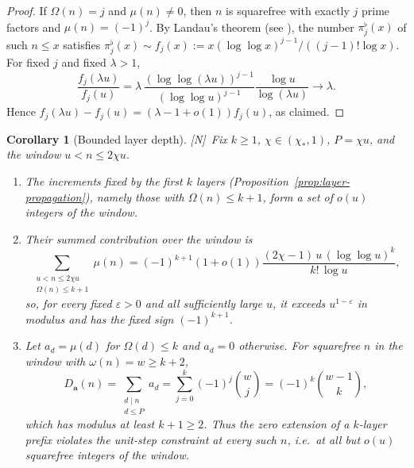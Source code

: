 \documentclass[11pt,reqno]{amsart}
\numberwithin{equation}{section}
\theoremstyle{plain}
\newtheorem{corollary}[theorem]{Corollary}
\theoremstyle{definition}
\theoremstyle{remark}
\newcommand{\eps}{\varepsilon}
\newcommand{\tagN}{\textup{[N]}}
\begin{document}
\begin{proof}
If $\Omega(n)=j$ and $\mu(n)\ne0$, then $n$ is squarefree with exactly $j$
prime factors and $\mu(n)=(-1)^j$. By Landau's theorem (see
\cite[Ch.~7]{MontgomeryVaughan2007}), the number $\pi_j^\flat(x)$ of such
$n\le x$ satisfies $\pi_j^\flat(x)\sim f_j(x):=x(\log\log x)^{j-1}/((j-1)!\log x)$.
For fixed $j$ and fixed $\lambda>1$,
\begin{equation}
\frac{f_j(\lambda u)}{f_j(u)}
=\lambda\,
\frac{(\log\log(\lambda u))^{j-1}}{(\log\log u)^{j-1}}
\frac{\log u}{\log(\lambda u)}\longrightarrow\lambda.
\end{equation}
Hence $f_j(\lambda u)-f_j(u)=(\lambda-1+o(1))f_j(u)$, as claimed.
\end{proof}

\begin{corollary}[Bounded layer depth]
\label{cor:bounded-depth}
\tagN\ Fix $k\ge1$, $\chi\in(\chi_*,1)$, $P=\chi u$, and the window
$u<n\le2\chi u$.
\begin{enumerate}[label=\textup{(\roman*)}]
\item The increments fixed by the first $k$ layers
(Proposition~\ref{prop:layer-propagation}), namely those with
$\Omega(n)\le k+1$, form a set of $o(u)$ integers of the window.
\item Their summed contribution over the window is
\begin{equation}
\sum_{\substack{u<n\le2\chi u\\ \Omega(n)\le k+1}}\mu(n)
=(-1)^{k+1}(1+o(1))\frac{(2\chi-1)\,u\,(\log\log u)^{k}}{k!\,\log u},
\end{equation}
so, for every fixed $\eps>0$ and all sufficiently large $u$, it exceeds $u^{1-\eps}$ in modulus and has the fixed sign $(-1)^{k+1}$.
\item Let $a_d=\mu(d)$ for $\Omega(d)\le k$ and $a_d=0$ otherwise.
For squarefree $n$ in the window with $\omega(n)=w\ge k+2$,
\begin{equation}
D_{\mathbf a}(n)=\sum_{\substack{d\mid n\\ d\le P}}a_d
=\sum_{j=0}^{k}(-1)^j\binom wj=(-1)^k\binom{w-1}{k},
\end{equation}
which has modulus at least $k+1\ge2$. Thus the zero extension of a
$k$-layer prefix violates the unit-step constraint at every such $n$, i.e.\
at all but $o(u)$ squarefree integers of the window.
\end{enumerate}
\end{corollary}
\end{document}
